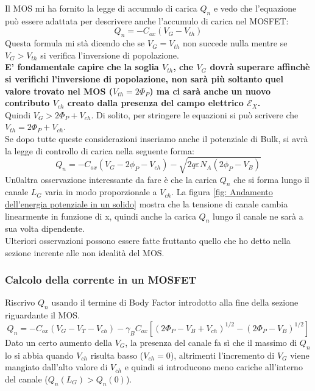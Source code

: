 \newpage
Il MOS mi ha fornito la legge di accumulo di carica $Q_n$ e vedo che l'equazione può essere adattata per descrivere anche l'accumulo di carica nel MOSFET:
%
\begin{equation}
    Q_n=-C_{ox}(V_G-V_{th})
\end{equation}
%
Questa formula mi stà dicendo che se $V_G=V_{th}$ non succede nulla mentre se $V_G>V_{th}$ si verifica l'inversione di popolazione.\\
%
\textbf{E' fondamentale capire che la soglia $V_{th}$, che $V_G$ dovrà superare affinchè si verifichi l'inversione di popolazione, non sarà più soltanto quel valore trovato nel MOS ($V_{th}=2\Phi_P$) ma ci sarà anche un nuovo contributo $V_{ch}$ creato dalla presenza del campo elettrico $\mathcal{E}_X$.\\}
Quindi $V_G > 2\Phi_P + V_{ch}$. Di solito, per stringere le equazioni si può scrivere che $V_{th}=2\Phi_P+V_{ch}$.\\

Se dopo tutte queste considerazioni inseriamo anche il potenziale di Bulk, si avrà la legge di controllo di carica nella seguente forma:
%
\begin{equation}
    Q_n = -C_{ox}(V_G-2\phi_P- V_{ch}) - \sqrt{2q\varepsilon_{} N_A(2\phi_P-V_B)}
\end{equation}
%
Un0altra osservazione interessante da fare è che la carica $Q_n$ che si forma lungo il canale $L_G$ varia in modo proporzionale a $V_{ch}$. La figura \ref{fig: Andamento dell'energia potenziale in un solido} mostra che la tensione di canale cambia linearmente in funzione di x, quindi anche la carica $Q_n$ lungo il canale ne sarà a sua volta dipendente.\\

Ulteriori osservazioni possono essere fatte fruttanto quello che ho detto nella sezione inerente alle non idealità del MOS.\\
%
\subsubsection{Calcolo della corrente in un MOSFET}
%
Riscrivo $Q_n$ usando il termine di Body Factor introdotto alla fine della sezione riguardante il MOS.
%
\begin{equation}
    Q_n=-C_{ox}(V_G-V_T-V_{ch})-\gamma_B C_{ox}[(2\Phi_P-V_B+V_{ch})^{1/2}-(2\Phi_P-V_B)^{1/2}]
\end{equation}
%
Dato un certo aumento della $V_G$, la presenza del canale fa sì che il massimo di $Q_n$ lo si abbia quando $V_{ch}$ risulta basso ($V_{ch}=0$), altrimenti l'incremento di $V_G$ viene mangiato dall'alto valore di $V_{ch}$ e quindi si introducono meno cariche all'interno del canale ($Q_n(L_G)>Q_n(0)$).\\

